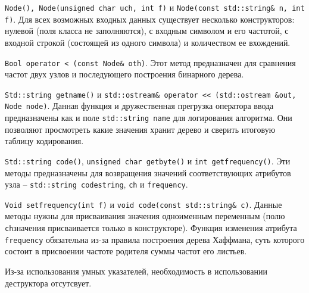 \texttt{Node(), Node(unsigned char uch, int f)} и \texttt{Node(const std::string\& n, int f)}.
Для всех возможных входных данных существует несколько конструкторов: нулевой (поля класса не заполняются), с входным символом и его частотой, с входной строкой (состоящей из одного символа) и количеством ее вхождений.



\texttt{Bool operator < (const Node\& oth)}.
Этот метод предназначен для сравнения частот двух узлов и последующего построения бинарного дерева.



\texttt{Std::string get{\textunderscore}name()} и \texttt{std::ostream\& operator << (std::ostream \&out, Node node)}.
Данная функция и дружественная прегрузка оператора ввода предназначены как и поле \texttt{std::string name} для логирования алгоритма.
Они позволяют просмотреть какие значения хранит дерево и сверить итоговую таблицу кодирования.



\texttt{Std::string code()}, \texttt{unsigned char get{\textunderscore}byte()} и \texttt{int get{\textunderscore}frequency()}.
Эти методы предназначены для возвращения значений соответствующих атрибутов узла -- \texttt{std::string code{\textunderscore}string}, \texttt{ch} и \texttt{frequency}.



\texttt{Void set{\textunderscore}frequency(int f)} и \texttt{void code(const std::string\& c)}.
Данные методы нужны для присваивания значения одноименным переменным (полю \texttt{ch}значения присваивается только в конструкторе).
Функция изменения атрибута \texttt{frequency} обязательна из-за правила построения дерева Хаффмана, суть которого состоит в присвоении частоте родителя суммы частот его листьев\cite{wiki_huf}.


Из-за использования умных указателей, необходимость в использовании деструктора отсутсвует.